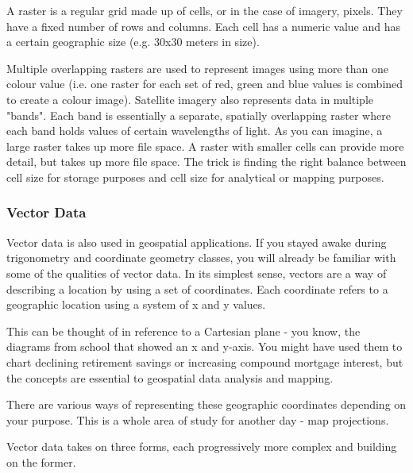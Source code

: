 A raster is a regular grid made up of cells, or in the case of imagery,
pixels. They have a fixed number of rows and columns. Each cell has a
numeric value and has a certain geographic size (e.g. 30x30 meters in
size).

Multiple overlapping rasters are used to represent images using more than
one colour value (i.e. one raster for each set of red, green and blue
values is combined to create a colour image). Satellite imagery also
represents data in multiple "bands". Each band is essentially a separate,
spatially overlapping raster where each band holds values of certain
wavelengths of light. As you can imagine, a large raster takes up more file
space. A raster with smaller cells can provide more detail, but takes up
more file space. The trick is finding the right balance between cell size
for storage purposes and cell size for analytical or mapping purposes.

\subsubsection{Vector Data}\label{label_vectordata}

Vector data is also used in geospatial applications. If you stayed awake
during trigonometry and coordinate geometry classes, you will already be
familiar with some of the qualities of vector data. In its simplest sense,
vectors are a way of describing a location by using a set of coordinates.
Each coordinate refers to a geographic location using a system of x and y
values.

This can be thought of in reference to a Cartesian plane - you know, the
diagrams from school that showed an x and y-axis. You might have used them
to chart declining retirement savings or increasing compound mortgage
interest, but the concepts are essential to geospatial data analysis and
mapping.

There are various ways of representing these geographic coordinates
depending on your purpose. This is a whole area of study for another day -
map projections.

Vector data takes on three forms, each progressively more complex and
building on the former.  

